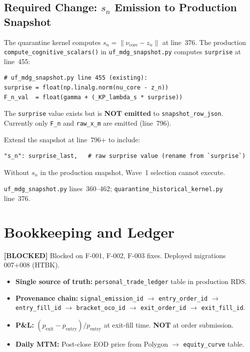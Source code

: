 \documentclass[11pt,a4paper]{article}
\newcommand{\statusblocked}{\textcolor{statusnotbuilt}{\textbf{[BLOCKED]}}}
\newcommand{\code}[1]{\texttt{\small#1}}
\begin{document}
\subsection{Required Change: $s_n$ Emission to Production Snapshot}

The quarantine kernel computes $s_n = \|\nu_{\text{core}} - z_n\|$ at line~376. The production \texttt{compute\_cognitive\_scalars()} in \texttt{uf\_mdg\_snapshot.py} computes \code{surprise} at line~455:

\begin{lstlisting}[style=tfe-py]
# uf_mdg_snapshot.py line 455 (existing):
surprise = float(np.linalg.norm(nu_core - z_n))
F_n_val  = float(gamma + (_KP_lambda_s * surprise))
\end{lstlisting}

The \code{surprise} value exists but is \textbf{NOT emitted} to \code{snapshot\_row\_json}. Currently only \code{F\_n} and \code{raw\_x\_m} are emitted (line~796).

\begin{warningbox}
Extend the snapshot at line~796+ to include:
\begin{lstlisting}[style=tfe-py]
"s_n": surprise_last,   # raw surprise value (rename from `surprise`)
\end{lstlisting}
Without $s_n$ in the production snapshot, Wave~1 selection cannot execute.
\end{warningbox}

\begin{sourcebox}
\texttt{uf\_mdg\_snapshot.py} lines~360--462; \texttt{quarantine\_historical\_kernel.py} line~376.
\end{sourcebox}

\section{Bookkeeping and Ledger}

\statusblocked{} Blocked on F-001, F-002, F-003 fixes. Deployed migrations 007+008 (HTBK).

\begin{itemize}
  \item \textbf{Single source of truth:} \texttt{personal\_trade\_ledger} table in production RDS.
  \item \textbf{Provenance chain:} \code{signal\_emission\_id} $\to$ \code{entry\_order\_id} $\to$ \code{entry\_fill\_id} $\to$ \code{bracket\_oco\_id} $\to$ \code{exit\_order\_id} $\to$ \code{exit\_fill\_id}.
  \item \textbf{P\&L:} $(p_{\text{exit}} - p_{\text{entry}}) / p_{\text{entry}}$ at exit-fill time. \textbf{NOT} at order submission.
  \item \textbf{Daily MTM:} Post-close EOD price from Polygon $\to$ \texttt{equity\_curve} table.
\end{itemize}
\end{document}
